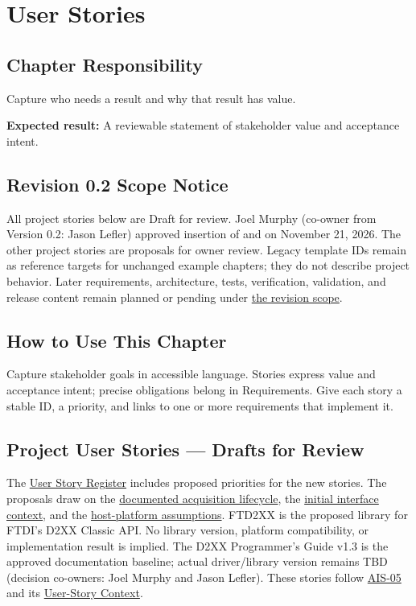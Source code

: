 \chapter{User Stories}
\section{Chapter Responsibility}
\label{Section:UserStoriesResponsibility}
Capture who needs a result and why that result has value.

\noindent\textbf{Expected result:} A reviewable statement of stakeholder value and acceptance intent.

\section{Revision 0.2 Scope Notice}
\label{Section:DeferredUserStories}
\begin{fsaNote}
All project stories below are Draft for review. Joel Murphy (co-owner from
Version 0.2: Jason Lefler) approved insertion of 
and  on November 21, 2026. The other project
stories are proposals for owner review. Legacy template IDs remain as
reference targets for unchanged example chapters; they do not describe
project behavior. Later requirements, architecture,
tests, verification, validation, and release content remain planned or pending
under \hyperref[Section:ProjectScope]{the revision scope}.
\end{fsaNote}

\section{How to Use This Chapter}
Capture stakeholder goals in accessible language. Stories express value and
acceptance intent; precise obligations belong in Requirements. Give each story
a stable ID, a priority, and links to one or more requirements that implement it.

\section{Project User Stories --- Drafts for Review}
\label{Section:ProjectDraftStories}
The \hyperref[Table:UserStories]{User Story Register} includes proposed
priorities for the new stories. The proposals draw on
the \hyperref[Section:ProjectLifecycleIntent]{documented acquisition lifecycle},
the \hyperref[Table:ProjectInterfaces]{initial interface context}, and the
\hyperref[Section:ToolchainHostAssumptions]{host-platform assumptions}.
FTD2XX is the proposed library for FTDI's D2XX Classic API. No library
version, platform compatibility, or implementation result is implied. The
D2XX Programmer's Guide v1.3 is the approved documentation baseline; actual
driver/library version remains TBD (decision co-owners: Joel Murphy and Jason Lefler).
These stories follow \hyperref[Skill:AIS-05]{AIS-05} and its
\hyperref[Section:AIUserStoryContext]{User-Story Context}.

